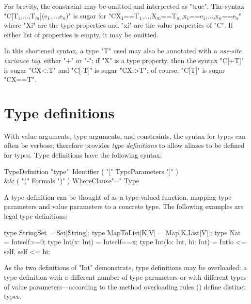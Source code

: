 For brevity, the constraint may be omitted and
interpreted as \xcd"true".
The syntax 
\xcdmath"C[T$_1$,$\dots$,T$_m$](e$_1$,$\dots$,e$_n$)" is sugar for
\xcdmath"C{X$_1$==T$_1$,$\dots$,X$_m$==T$_m$,x$_1$==e$_1$,$\dots$,x$_n$==e$_n$}"
where \xcd"Xi" are the type properties and \xcd"xi" are the
value properties of \xcd"C".  
If either list of properties is empty, it may be omitted.

In this shortened syntax, a type \xcd"T" used may also be annotated
with
a \emph{use-site variance tag}, either \xcd"+" or \xcd"-":
if \xcd"X" is a type property, then
the syntax \xcd"C[+T]" is sugar \xcd"C{X<:T}" and
\xcd"C[-T]" is sugar \xcd"C{X:>T}"; of course,
\xcd"C[T]" is sugar \xcd"C{X==T}".



\section{Type definitions}

With value arguments, type arguments, and constraints, the
syntax for \Xten{} types can often be verbose;
\Xten{} therefore provides {\em type definitions}
to allow aliases to be defined for types.
Type definitions have the following syntax:

\begin{grammar}
TypeDefinition \: 
                \xcd"type"~Identifier
                           ( \xcd"[" TypeParameters \xcd"]" )\opt \\
                        && ( \xcd"(" Formals \xcd")" )\opt
                            WhereClause\opt \xcd"=" Type \\
\end{grammar}

\noindent
A type definition can be thought of as a type-valued function,
mapping type parameters and value parameters to a concrete type.
%
The following examples are legal type definitions:
\begin{xten}
type StringSet = Set[String];
type MapToList[K,V] = Map[K,List[V]];
type Nat = Int{self>=0};
type Int(x: Int) = Int{self==x};
type Int(lo: Int, hi: Int) = Int{lo <= self, self <= hi};
\end{xten}

As the two definitions of \xcd"Int" demonstrate, type definitions may 
be overloaded: a type definition with a different number of type
parameters or with different types of value
parameters---according to the method overloading rules
() define distinct types.

